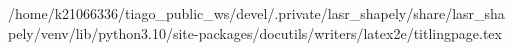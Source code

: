 /home/k21066336/tiago_public_ws/devel/.private/lasr_shapely/share/lasr_shapely/venv/lib/python3.10/site-packages/docutils/writers/latex2e/titlingpage.tex